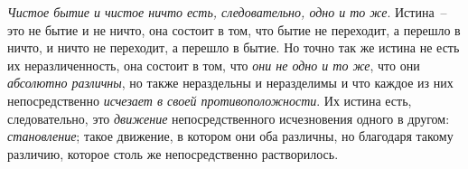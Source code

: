 \emph{Чистое бытие и чистое ничто есть, следовательно,
одно и то же}. Истина~-- это не бытие и не ничто, она
состоит в том, что бытие не переходит, а перешло в ничто,
и ничто не переходит, а перешло в бытие. Но точно так
же истина не есть их неразличенность, она состоит в том,
что \emph{они не одно и то же}, что они \emph{абсолютно различны},
но также нераздельны и неразделимы и что каждое из
них непосредственно \emph{исчезает в своей противоположности}.
Их истина есть, следовательно, это \emph{движение} непосредственного
исчезновения одного в другом: \emph{становление};
такое движение, в котором они оба различны, но
благодаря такому различию, которое столь же непосредственно
растворилось.

